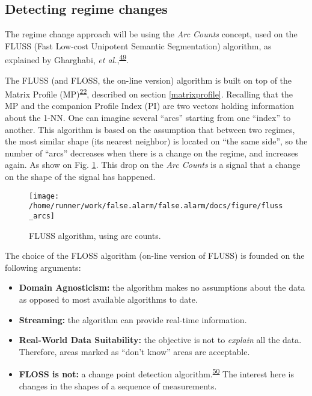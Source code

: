 \documentclass[12pt,twoside]{fmupthesis}
\providecommand{\tightlist}{%
  \setlength{\itemsep}{0pt}\setlength{\parskip}{0pt}}
\begin{document}
\hypertarget{detecting-regime-changes}{%
\subsection{Detecting regime changes}\label{detecting-regime-changes}}

The regime change approach will be using the \emph{Arc Counts} concept, used on the FLUSS (Fast Low-cost
Unipotent Semantic Segmentation) algorithm, as explained by Gharghabi, \emph{et al.},\textsuperscript{\protect\hyperlink{ref-gharghabi2018}{49}}.

The FLUSS (and FLOSS, the on-line version) algorithm is built on top of the Matrix Profile
(MP)\textsuperscript{\protect\hyperlink{ref-Yeh2017a}{22}}, described on section \ref{matrixprofile}. Recalling that the MP and the companion
Profile Index (PI) are two vectors holding information about the 1-NN. One can imagine several
``arcs'' starting from one ``index'' to another. This algorithm is based on the assumption that between
two regimes, the most similar shape (its nearest neighbor) is located on ``the same side'', so the
number of ``arcs'' decreases when there is a change on the regime, and increases again. As show on
Fig. \ref{fig:arcsoriginal}. This drop on the \emph{Arc Counts} is a signal that a change on the shape
of the signal has happened.
\begin{figure}

{\centering \texttt{[image: /home/runner/work/false.alarm/false.alarm/docs/figure/fluss\_arcs]} 

}

\caption{FLUSS algorithm, using arc counts.}\label{fig:arcsoriginal}
\end{figure}
The choice of the FLOSS algorithm (on-line version of FLUSS) is founded on the following arguments:
\begin{itemize}
\tightlist
\item
  \textbf{Domain Agnosticism:} the algorithm makes no assumptions about the data as opposed to most
  available algorithms to date.
\item
  \textbf{Streaming:} the algorithm can provide real-time information.
\item
  \textbf{Real-World Data Suitability:} the objective is not to \emph{explain} all the data. Therefore, areas
  marked as ``don't know'' areas are acceptable.
\item
  \textbf{FLOSS is not:} a change point detection algorithm.\textsuperscript{\protect\hyperlink{ref-aminikhanghahi2016}{50}} The interest here is
  changes in the shapes of a sequence of measurements.
\end{itemize}
\end{document}
